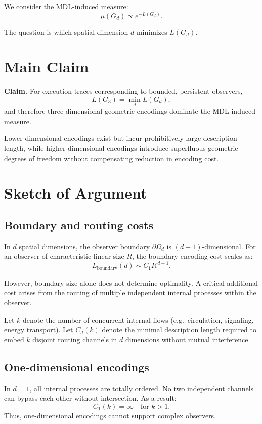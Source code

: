 \documentclass[11pt]{article}
\begin{document}
We consider the MDL-induced measure:
\[
\mu(G_d) \propto e^{-L(G_d)}.
\]

The question is which spatial dimension $d$ minimizes $L(G_d)$.

\section{Main Claim}

\textbf{Claim.} For execution traces corresponding to bounded, persistent observers,
\[
L(G_3) = \min_d L(G_d),
\]
and therefore three-dimensional geometric encodings dominate the MDL-induced measure.

Lower-dimensional encodings exist but incur prohibitively large description length, while higher-dimensional encodings introduce superfluous geometric degrees of freedom without compensating reduction in encoding cost.

\section{Sketch of Argument}

\subsection{Boundary and routing costs}

In $d$ spatial dimensions, the observer boundary $\partial \Omega_d$ is $(d-1)$-dimensional. For an observer of characteristic linear size $R$, the boundary encoding cost scales as:
\[
L_{\text{boundary}}(d) \sim C_1 R^{\,d-1}.
\]

However, boundary size alone does not determine optimality. A critical additional cost arises from the routing of multiple independent internal processes within the observer.

Let $k$ denote the number of concurrent internal flows (e.g.\ circulation, signaling, energy transport). Let $C_d(k)$ denote the minimal description length required to embed $k$ disjoint routing channels in $d$ dimensions without mutual interference.

\subsection{One-dimensional encodings}

In $d=1$, all internal processes are totally ordered. No two independent channels can bypass each other without intersection. As a result:
\[
C_1(k) = \infty \quad \text{for } k > 1.
\]
Thus, one-dimensional encodings cannot support complex observers.
\end{document}
